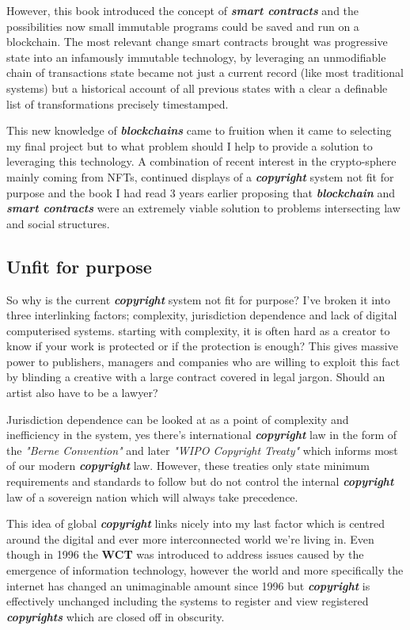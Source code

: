 \documentclass[12pt]{article}
\newcommand{\keyword}[1]{\textbf{\textit{#1}}}
\begin{document}
However, this book introduced the concept of \keyword{smart contracts} and the possibilities now small immutable programs could be saved and run on a blockchain. The most relevant change smart contracts brought was progressive state into an infamously immutable technology, by leveraging an unmodifiable chain of transactions state became not just a current record (like most traditional systems) but a historical account of all previous states with a clear a definable list of transformations precisely timestamped.

This new knowledge of \keyword{blockchains} came to fruition when it came to selecting my final project but to what problem should I help to provide a solution to leveraging this technology. A combination of recent interest in the crypto-sphere mainly coming from NFTs, continued displays of a \keyword{copyright} system not fit for purpose\cite{DMCA-abuse} and the book I had read 3 years earlier proposing that \keyword{blockchain} and \keyword{smart contracts} were an extremely viable solution to problems intersecting law and social structures.

\subsection{Unfit for purpose}
\label{sec:unfit}

So why is the current \keyword{copyright} system not fit for purpose? I've broken it into three interlinking factors; complexity, jurisdiction dependence and lack of digital computerised systems. starting with complexity, it is often hard as a creator to know if your work is protected or if the protection is enough? This gives massive power to publishers, managers and companies who are willing to exploit this fact by blinding a creative with a large contract covered in legal jargon. Should an artist also have to be a lawyer?

Jurisdiction dependence can be looked at as a point of complexity and inefficiency in the system, yes there's international \keyword{copyright} law in the form of the \textit{"Berne Convention"}\cite{Berne} and later \textit{"WIPO Copyright Treaty"}\cite{WIPO} which informs most of our modern \keyword{copyright} law. However, these treaties only state minimum requirements and standards to follow but do not control the internal \keyword{copyright} law of a sovereign nation which will always take precedence.

This idea of global \keyword{copyright} links nicely into my last factor which is centred around the digital and ever more interconnected world we're living in. Even though in 1996 the \textbf{WCT}\cite{WIPO} was introduced to address issues caused by the emergence of information technology, however the world and more specifically the internet has changed an unimaginable amount since 1996 but \keyword{copyright} is effectively unchanged including the systems to register and view registered \keyword{copyrights} which are closed off in obscurity.
\end{document}
